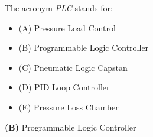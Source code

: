 

The acronym {\it PLC} stands for:

\begin{itemize}
\item{(A)} Pressure Load Control
\vskip 5pt 
\item{(B)} Programmable Logic Controller
\vskip 5pt 
\item{(C)} Pneumatic Logic Capstan
\vskip 5pt 
\item{(D)} PID Loop Controller
\vskip 5pt 
\item{(E)} Pressure Loss Chamber
\end{itemize}







{\bf (B)} Programmable Logic Controller
 










